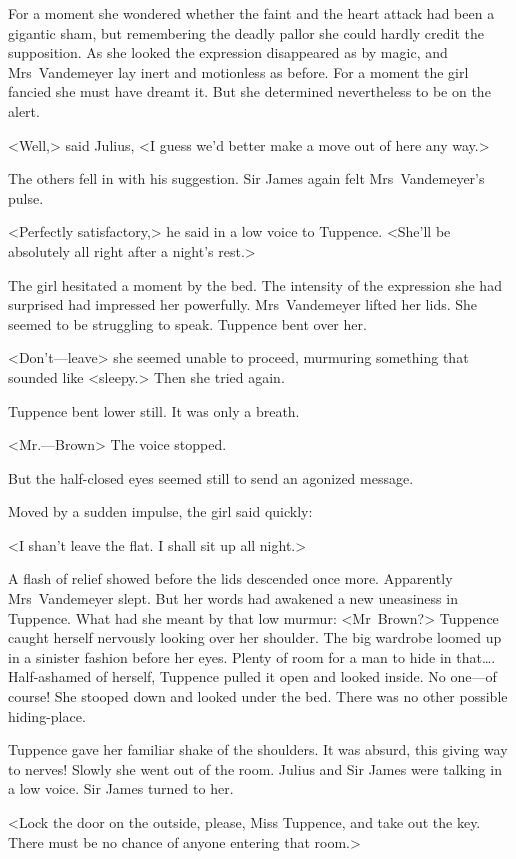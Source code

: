 For a moment she wondered whether the faint and the heart attack had been a gigantic sham, but remembering the deadly pallor she could hardly credit the supposition. As she looked the expression disappeared as by magic, and Mrs~Vandemeyer lay inert and motionless as before. For a moment the girl fancied she must have dreamt it. But she determined nevertheless to be on the alert.

<Well,> said Julius, <I guess we'd better make a move out of here any way.>

The others fell in with his suggestion. Sir James again felt Mrs~Vandemeyer's pulse.

<Perfectly satisfactory,> he said in a low voice to Tuppence. <She'll be absolutely all right after a night's rest.>

The girl hesitated a moment by the bed. The intensity of the expression she had surprised had impressed her powerfully. Mrs~Vandemeyer lifted her lids. She seemed to be struggling to speak. Tuppence bent over her.

<Don't—leave\longdash> she seemed unable to proceed, murmuring something that sounded like <sleepy.> Then she tried again.

Tuppence bent lower still. It was only a breath.

<Mr.—Brown\longdash> The voice stopped.

But the half-closed eyes seemed still to send an agonized message.

Moved by a sudden impulse, the girl said quickly:

<I shan't leave the flat. I shall sit up all night.>

A flash of relief showed before the lids descended once more. Apparently Mrs~Vandemeyer slept. But her words had awakened a new uneasiness in Tuppence. What had she meant by that low murmur: <Mr~Brown?> Tuppence caught herself nervously looking over her shoulder. The big wardrobe loomed up in a sinister fashion before her eyes. Plenty of room for a man to hide in that\dots. Half-ashamed of herself, Tuppence pulled it open and looked inside. No one—of course! She stooped down and looked under the bed. There was no other possible hiding-place.

Tuppence gave her familiar shake of the shoulders. It was absurd, this giving way to nerves! Slowly she went out of the room. Julius and Sir James were talking in a low voice. Sir James turned to her.

<Lock the door on the outside, please, Miss Tuppence, and take out the key. There must be no chance of anyone entering that room.>

